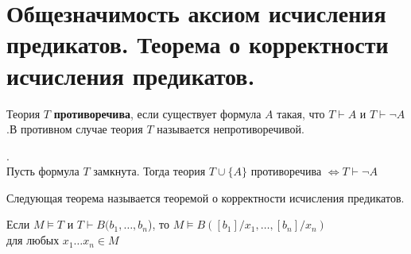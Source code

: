 \section{Общезначимость аксиом исчисления предикатов. Теорема о корректности исчисления предикатов.}
\begin{definition}
Теория $T$ \textbf{противоречива}, если существует формула $A$
такая, что $T\vdash A$ и  $T\vdash \neg A$.В противном случае теория $T$ называется непротиворечивой.
\end{definition}
\begin{corollary}.\\ Пусть формула $T$ замкнута. Тогда теория $T \cup \{A\}$ противоречива $\Longleftrightarrow T \vdash \neg A$
\end{corollary}
Следующая теорема называется теоремой о корректности исчисления предикатов.
\begin{theorem}
Если $M\vDash T$ и $T \vdash B(b_1,\dots,b_n$), то $M \vDash B([b_1]/x_1,\dots,[b_n]/x_n)$ \\для любых $x_1\dots x_n \in M$
\end{theorem}

